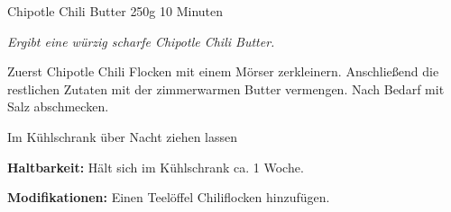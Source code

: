 \begin{recipe}{Chipotle Chili Butter} {250g} {10 Minuten}

\freeform
\textit{Ergibt eine würzig scharfe Chipotle Chili Butter.}


Zuerst Chipotle Chili Flocken mit einem Mörser zerkleinern.
Anschließend die restlichen Zutaten mit der zimmerwarmen Butter vermengen.
Nach Bedarf mit Salz abschmecken.

\newstep
Im Kühlschrank über Nacht ziehen lassen

\freeform
\hrulefill

\freeform 
\textbf{Haltbarkeit:}
Hält sich im Kühlschrank ca. 1 Woche.

\freeform 
\textbf{Modifikationen:}
Einen Teelöffel Chiliflocken hinzufügen.

\end{recipe}
